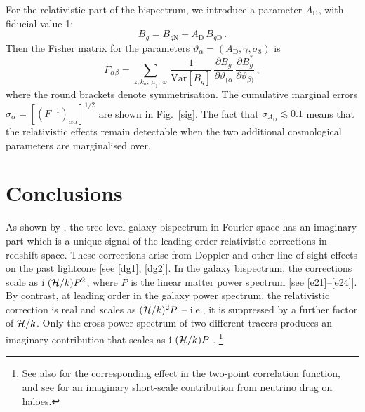 For the relativistic part of the bispectrum, we introduce a parameter  $A_{\mathrm{D}}$, with fiducial value 1: 
\begin{equation}
B_g=B_{g\mathrm{N}}+A_{\mathrm{D}}\,B_{g\mathrm{D}} \,.
\end{equation}
Then the Fisher matrix for the parameters  $\vartheta_\alpha=(A_{\mathrm{D}},\gamma,\sigma_8)$ is
\begin{equation}
F_{\alpha\beta} = 
\sum_{z,k_a,\,\mu_{1},\,\varphi}\,\frac{1}{{\mathrm{Var}} [{B_{g}}]}
\,\frac{\partial B_{g}}{\partial \vartheta_{(\alpha}}\,\frac{\partial B^*_{g}}{\partial \vartheta_{\beta)}}\,,\label{fm}
\end{equation} 
where the round brackets denote symmetrisation. The cumulative marginal errors $\sigma_\alpha = [(F^{-1})_{\alpha\alpha}]^{1/2}$  are shown in Fig.~\ref{sig}. The fact that $\sigma_{A_{\mathrm{D}}}\lesssim 0.1$  means that the relativistic effects remain detectable when the two additional cosmological parameters are marginalised over.
%
%
%
%
\section{{Conclusions}}

As shown by \cite{Clarkson:2018dwn}, the tree-level galaxy bispectrum in Fourier space has an imaginary part which is a unique signal of the leading-order relativistic corrections in redshift space. These corrections arise from Doppler and other line-of-sight effects on the past lightcone [see \eqref{dg1}, \eqref{dg2}]. In the galaxy bispectrum, the corrections scale as ${\mathrm{i\,}}\,(\mathcal{H}/k)P^2$, where $P$ is the linear matter power spectrum [see \eqref{e21}--\eqref{e24}]. By contrast,  at leading order in the galaxy power spectrum, the relativistic correction is real and scales as $(\mathcal{H}/k)^2P$ -- i.e., it is suppressed by a further factor of  $\mathcal{H}/k$. 
Only the cross-power spectrum of two different tracers produces an imaginary contribution that scales as ${\mathrm{i\,}}\,(\mathcal{H}/k)P$ \cite{McDonald:2009dh}.
\footnote{See also \cite{Bonvin:2013ogt, Bonvin:2015kuc, Gaztanaga:2015jrs, Irsic:2015nla, Hall:2016bmm,Lepori:2017twd,Bonvin:2018ckp, Lepori:2019cqp} for the corresponding effect in the two-point correlation function, and see \cite{Okoli:2016vmd} for an imaginary {short-scale} contribution from neutrino drag on haloes.}



